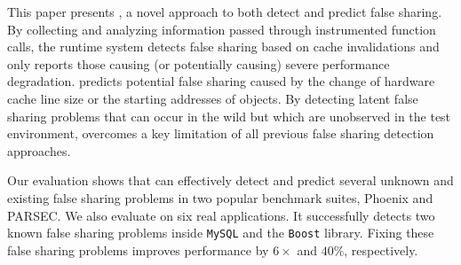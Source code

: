 \label{sec:conclusion}
This paper presents \Predator{}, a novel approach to both detect and predict false sharing. By collecting and analyzing information passed through instrumented function calls, the runtime system detects false sharing based on cache invalidations and only reports those  causing (or potentially causing) severe performance degradation.
\Predator{} predicts potential false sharing caused by the change of hardware cache line size or the starting addresses of objects. By detecting latent false sharing problems that can occur in the wild but which are unobserved in the test environment, \Predator{} overcomes a key limitation of
all previous false sharing detection approaches.

Our evaluation shows that \Predator{} can effectively detect and predict several unknown and existing false sharing problems 
in two popular benchmark suites, Phoenix and PARSEC. 
We also evaluate \Predator{} on six real applications. 
It successfully detects two known false sharing problems inside \texttt{MySQL} and the \texttt{Boost} library.
Fixing these false sharing problems improves performance by $6\times$ and $40\%$, respectively.
